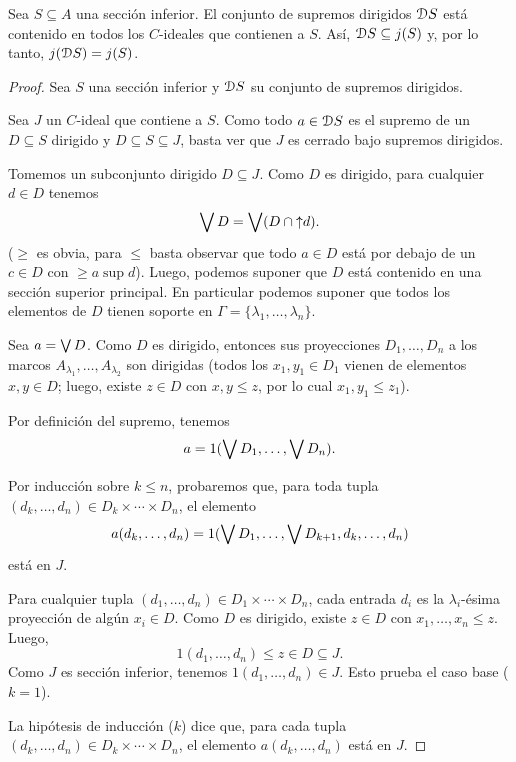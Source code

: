\begin{lemma}
  Sea $S\subseteq A$ una sección inferior.
  El conjunto de supremos dirigidos $\D S$ está contenido en todos los
  $C$-ideales que contienen a $S$. Así, $\D S\subseteq j(S)$ y, por lo
  tanto, $j(\cal DS)=j(S)$.
\end{lemma}
\begin{proof}
  Sea $S$ una sección inferior y $\D S$ su conjunto de supremos
  dirigidos.

  Sea $J$ un $C$-ideal que contiene a $S$.
  Como todo $a\in\D S$ es el supremo de un $D\subseteq S$ dirigido
  y $D\subseteq S\subseteq J$, basta ver que $J$ es cerrado bajo
  supremos dirigidos.

  Tomemos un subconjunto dirigido $D\subseteq J$.
  Como $D$ es dirigido, para cualquier $d\in D$ tenemos
  \[
    \Sup D = \Sup(D\cap{\uparrow}d)
  .\]
  ($\geq$ es obvia, para $\leq$ basta observar que todo $a\in D$
  está por debajo de un $c\in D$ con $\geq a\sup d$).
  Luego, podemos suponer que $D$ está contenido en una sección
  superior principal.
  En particular podemos suponer que todos los elementos de $D$
  tienen soporte en $\Gamma=\{\lambda_1,\dots,\lambda_n\}$.

  Sea $a=\Sup D$.
  Como $D$ es dirigido, entonces sus proyecciones $D_1,\dots,D_n$ a
  los marcos $A_{\lambda_1},\dots,A_{\lambda_2}$ son dirigidas
  (todos los $x_1,y_1\in D_1$ vienen de elementos $x,y\in D$;
  luego, existe $z\in D$ con $x,y\leq z$, por lo cual $x_1,y_1\leq
  z_1$).

  Por definición del supremo, tenemos
  \[
    a = 1(\Sup D_1,\dots,\Sup D_n)
  .\]

  Por inducción sobre $k\leq n$, probaremos que, para toda tupla
  $(d_k,\dots,d_n)\in D_k\times\cdots\times D_n$, el elemento
  \[
    a(d_k,\dots,d_n)
    =
    1(\Sup D_1,\dots,\Sup D_{k+1},d_k,\dots,d_n)
  \]
  está en $J$.

  Para cualquier tupla $(d_1,\dots,d_n)\in D_1\times\cdots\times
  D_n$, cada entrada $d_i$ es la $\lambda_i$-ésima
  proyección de algún $x_i\in D$.
  Como $D$ es dirigido, existe $z\in D$ con $x_1,\dots,x_n\leq z$.
  Luego,
  \[
    1(d_1,\dots,d_n)\leq z\in D \subseteq J
  .\]
  Como $J$ es sección inferior, tenemos $1(d_1,\dots,d_n)\in J$.
  Esto prueba el caso base ($k=1$).

  La hipótesis de inducción ($k$) dice que, para cada tupla
  $(d_k,\dots,d_n)\in D_k\times\cdots\times D_n$, el elemento
  $a(d_k,\dots,d_n)$ está en $J$.


\end{proof}
